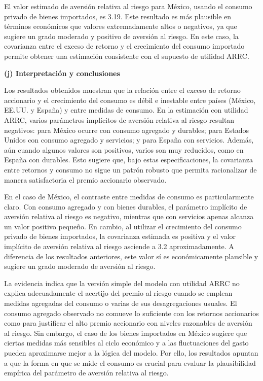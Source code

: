 \documentclass{article}\usepackage[]{graphicx}\usepackage[]{xcolor}
\begin{document}
El valor estimado de aversión relativa al riesgo para México, usando el consumo privado de bienes importados, es 3.19. Este resultado es más plausible en términos económicos que valores extremadamente altos o negativos, ya que sugiere un grado moderado y positivo de aversión al riesgo. En este caso, la covarianza entre el exceso de retorno y el crecimiento del consumo importado permite obtener una estimación consistente con el supuesto de utilidad ARRC.

\newpage
\textbf{(j) Interpretación y conclusiones}

Los resultados obtenidos muestran que la relación entre el exceso de retorno accionario y el crecimiento del consumo es débil e inestable entre países (México, EE.UU. y España) y entre medidas de consumo. En la estimación con utilidad ARRC, varios parámetros implícitos de aversión relativa al riesgo resultan negativos: para México ocurre con consumo agregado y durables; para Estados Unidos con consumo agregado y servicios; y para España con servicios. Además, aún cuando algunos valores son positivos, varios son muy reducidos, como en España con durables. Esto sugiere que, bajo estas especificaciones, la covarianza entre retornos y consumo no sigue un patrón robusto que permita racionalizar de manera satisfactoria el premio accionario observado.

En el caso de México, el contraste entre medidas de consumo es particularmente claro. Con consumo agregado y con bienes durables, el parámetro implícito de aversión relativa al riesgo es negativo, mientras que con servicios apenas alcanza un valor positivo pequeño. En cambio, al utilizar el crecimiento del consumo privado de bienes importados, la covarianza estimada es positiva y el valor implícito de aversión relativa al riesgo asciende a 3.2 aproximadamente. A diferencia de los resultados anteriores, este valor sí es económicamente plausible y sugiere un grado moderado de aversión al riesgo.

La evidencia indica que la versión simple del modelo con utilidad ARRC no explica adecuadamente el acertijo del premio al riesgo cuando se emplean medidas agregadas del consumo o varias de sus desagregaciones usuales. El consumo agregado observado no comueve lo suficiente con los retornos accionarios como para justificar el alto premio accionario con niveles razonables de aversión al riesgo. Sin embargo, el caso de los bienes importados en México sugiere que ciertas medidas más sensibles al ciclo económico y a las fluctuaciones del gasto pueden aproximarse mejor a la lógica del modelo. Por ello, los resultados apuntan a que la forma en que se mide el consumo es crucial para evaluar la plausibilidad empírica del parámetro de aversión relativa al riesgo.
\end{document}
